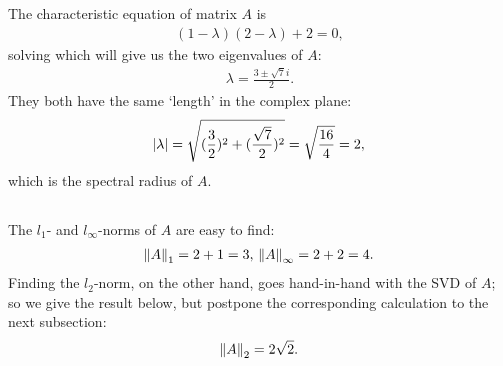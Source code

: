 \documentclass[11pt]{article}
\begin{document}
\maketitle
\section{}
\subsection{}
The characteristic equation of matrix $A$ is 
\begin{equation}\begin{split} (1-\lambda)(2-\lambda)+2 = 0,\end{split}\nonumber\end{equation} 
solving which will give us the two eigenvalues of $A$:
\begin{equation}\begin{split} \lambda = \frac{3\pm\sqrt{7}i}2.\end{split}\nonumber\end{equation} 
They both have the same `length' in the complex plane:
$$\abs{\lambda}=\sqrt{(\frac32)^2+(\frac{\sqrt{7}}2)^2}=\sqrt{\frac{16}4}=2,$$
which is the spectral radius of $A$.

\subsection{}
The $l_1$- and $l_{\infty}$-norms of $A$ are easy to find:
\begin{equation}\begin{split}\norm{A}_1=2+1=3,\,\,\norm{A}_\infty=2+2=4.\end{split}\nonumber\end{equation}
Finding the $l_2$-norm, on the other hand, goes hand-in-hand with the SVD of $A$; so we give the result below, but postpone the corresponding calculation to the next subsection:
\begin{equation}\begin{split} \norm{A}_2=2\sqrt{2}.\end{split}\nonumber\end{equation} 
\end{document}
